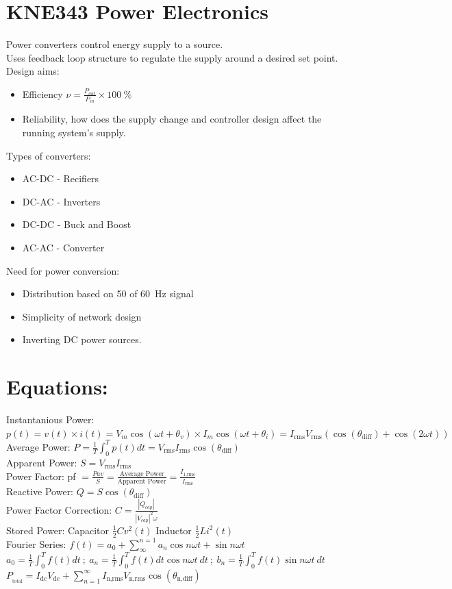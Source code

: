 \documentclass[10pt,landscape,a4paper]{article}
\newcommand{\subs}[1]{\ensuremath{_{\text{#1}}}}
\newcommand{\rms}{\subs{rms}}
\newcommand{\nrms}[1]{\subs{#1,rms}}
\newcommand{\half}{\frac{1}{2}}
\begin{document}
	\begin{multicols*}{4}
		
		\section{KNE343 Power Electronics}
		Power converters control energy supply to a source.\\
		Uses feedback loop structure to regulate the supply around a desired set point.\\
		Design aims:
		\begin{itemize}
			\item Efficiency $\nu = \frac{P_{out}}{P_{in}} \times 100~\%$
			\item Reliability, how does the supply change and controller design affect the running system's supply.
		\end{itemize}
		Types of converters:
		\begin{itemize}
			\item AC-DC - Recifiers
			\item DC-AC - Inverters
			\item DC-DC - Buck and Boost
			\item AC-AC - Converter
		\end{itemize}
		Need for power conversion:
		\begin{itemize}
			\item Distribution based on 50 of 60~Hz signal
			\item Simplicity of network design
			\item Inverting DC power sources.
		\end{itemize}
		\section{Equations:}
		Instantanious Power: $ p(t) = v(t) \times i(t) = V_m\cos(\omega t+\theta_v) \times I_m\cos(\omega t + \theta_i) = I\rms V\rms (\cos(\theta\subs{diff}) + \cos(2\omega t))$ \\
		Average Power: $ P = \frac{1}{T} \int_{0}^{T}p(t)dt = V\rms I\rms\cos(\theta_{\text{diff}}) $\\
		Apparent Power: $ S = V\rms I\rms $\\
		Power Factor: pf $ = \frac{Pav}{S} = \frac{\text{Average Power}}{\text{Apparent Power}} = \frac{I\nrms{1}}{I\rms} $\\
		Reactive Power: $ Q = S\cos(\theta_{\text{diff}}) $\\
		Power Factor Correction: $ C = \frac{|Q_{cap}|}{|V_{cap}|^2\omega} $\\
		Stored Power: Capacitor $ \half C v^2(t) $ Inductor $ \half L i^2(t) $ \\
		Fourier Series: $ f(t) = a_0 + \sum_{\infty}^{n=1} a_n \cos n \omega t + \sin n\omega t $\\
		$ a_0 = \frac{1}{T}\int_{0}^{T}f(t)dt ~;~ a_n = \frac{1}{T}\int_{0}^{T}f(t)dt \cos n \omega t~dt ~;~ b_n = \frac{1}{T}\int_{0}^{T}f(t) \sin n \omega t~dt $\\
		$P_{\subs{total}} = I\subs{dc}V\subs{dc} + \sum_{n=1}^{\infty} I\nrms{n}V\nrms{n}\cos(\theta\subs{n,diff}) $\\
		

\end{multicols*}
\end{document}
